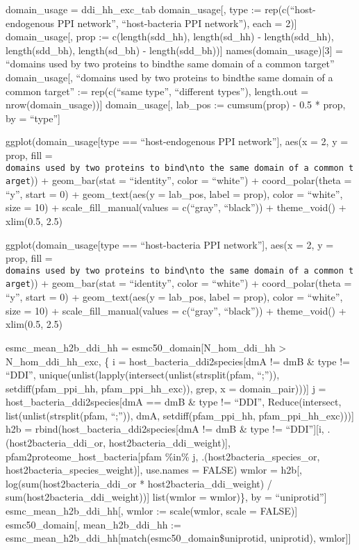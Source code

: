 \documentclass[
]{article}
\begin{document}
domain\_usage = ddi\_hh\_exc\_tab domain\_usage{[}, type :=
rep(c(``host-endogenous PPI network'', ``host-bacteria PPI network''),
each = 2){]} domain\_usage{[}, prop := c(length(sdd\_hh), length(sd\_hh)
- length(sdd\_hh), length(sdd\_bh), length(sd\_bh) - length(sdd\_bh)){]}
names(domain\_usage){[}3{]} = ``domains used by two proteins to
bind\nto the same domain of a common target'' domain\_usage{[},
``domains used by two proteins to bind\nto the same domain of a common
target'' := rep(c(``same type'', ``different types''), length.out =
nrow(domain\_usage)){]} domain\_usage{[}, lab\_pos := cumsum(prop) - 0.5
* prop, by = ``type''{]}

ggplot(domain\_usage{[}type == ``host-endogenous PPI network''{]}, aes(x
= 2, y = prop, fill =
\texttt{domains\ used\ by\ two\ proteins\ to\ bind\textbackslash{}nto\ the\ same\ domain\ of\ a\ common\ target}))
+ geom\_bar(stat = ``identity'', color = ``white'') + coord\_polar(theta
= ``y'', start = 0) + geom\_text(aes(y = lab\_pos, label = prop), color
= ``white'', size = 10) + scale\_fill\_manual(values = c(``gray'',
``black'')) + theme\_void() + xlim(0.5, 2.5)

ggplot(domain\_usage{[}type == ``host-bacteria PPI network''{]}, aes(x =
2, y = prop, fill =
\texttt{domains\ used\ by\ two\ proteins\ to\ bind\textbackslash{}nto\ the\ same\ domain\ of\ a\ common\ target}))
+ geom\_bar(stat = ``identity'', color = ``white'') + coord\_polar(theta
= ``y'', start = 0) + geom\_text(aes(y = lab\_pos, label = prop), color
= ``white'', size = 10) + scale\_fill\_manual(values = c(``gray'',
``black'')) + theme\_void() + xlim(0.5, 2.5)

esmc\_mean\_h2b\_ddi\_hh = esmc50\_domain{[}N\_hom\_ddi\_hh
\textgreater{} N\_hom\_ddi\_hh\_exc, \{ i =
host\_bacteria\_ddi2species{[}dmA != dmB \& type != ``DDI'',
unique(unlist(lapply(intersect(unlist(strsplit(pfam, ``;'')),
setdiff(pfam\_ppi\_hh, pfam\_ppi\_hh\_exc)), grep, x =
domain\_pair))){]} j = host\_bacteria\_ddi2species{[}dmA == dmB \& type
!= ``DDI'', Reduce(intersect, list(unlist(strsplit(pfam, ``;'')), dmA,
setdiff(pfam\_ppi\_hh, pfam\_ppi\_hh\_exc))){]} h2b =
rbind(host\_bacteria\_ddi2species{[}dmA != dmB \& type !=
``DDI''{]}{[}i, .(host2bacteria\_ddi\_or,
host2bacteria\_ddi\_weight){]}, pfam2proteome\_host\_bacteria{[}pfam
\%in\% j, .(host2bacteria\_species\_or,
host2bacteria\_species\_weight){]}, use.names = FALSE) wmlor = h2b{[},
log(sum(host2bacteria\_ddi\_or * host2bacteria\_ddi\_weight) /
sum(host2bacteria\_ddi\_weight)){]} list(wmlor = wmlor)\}, by =
``uniprotid''{]} esmc\_mean\_h2b\_ddi\_hh{[}, wmlor := scale(wmlor,
scale = FALSE){]} esmc50\_domain{[}, mean\_h2b\_ddi\_hh :=
esmc\_mean\_h2b\_ddi\_hh{[}match(esmc50\_domain\$uniprotid, uniprotid),
wmlor{]}{]}
\end{document}
